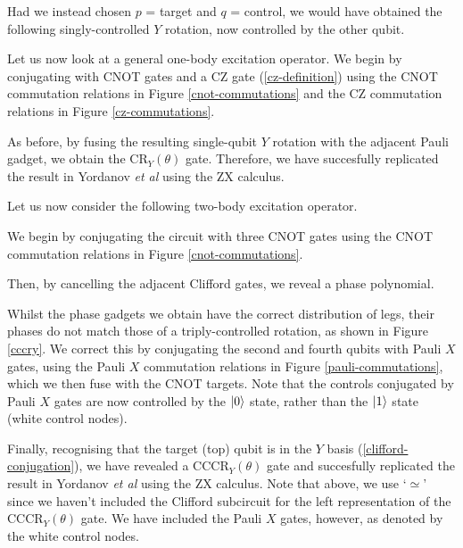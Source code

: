 
Had we instead chosen $p$ = target and $q$ = control, we would have obtained the following singly-controlled $Y$ rotation, now controlled by the other qubit.


Let us now look at a general one-body excitation operator. We begin by conjugating with CNOT gates and a CZ gate (\ref{cz-definition}) using the CNOT commutation relations in Figure \ref{cnot-commutations} and the CZ commutation relations in Figure \ref{cz-commutations}.


As before, by fusing the resulting single-qubit $Y$ rotation with the adjacent Pauli gadget, we obtain the CR$_Y(\theta)$ gate. Therefore, we have succesfully replicated the result in Yordanov \textit{et al} using the ZX calculus.


Let us now consider the following two-body excitation operator.


We begin by conjugating the circuit with three CNOT gates using the CNOT commutation relations in Figure \ref{cnot-commutations}.


Then, by cancelling the adjacent Clifford gates, we reveal a phase polynomial.


Whilst the phase gadgets we obtain have the correct distribution of legs, their phases do not match those of a triply-controlled rotation, as shown in Figure \ref{cccry}. We correct this by conjugating the second and fourth qubits with Pauli $X$ gates, using the Pauli $X$ commutation relations in Figure \ref{pauli-commutations}, which we then fuse with the CNOT targets. Note that the controls conjugated by Pauli $X$ gates are now controlled by the $\ket 0$ state, rather than the $\ket 1$ state (white control nodes).


Finally, recognising that the target (top) qubit is in the $Y$ basis (\ref{clifford-conjugation}), we have revealed a CCCR$_Y(\theta)$ gate and succesfully replicated the result in Yordanov \textit{et al} using the ZX calculus. Note that above, we use `$\simeq$' since we haven't included the Clifford subcircuit for the left representation of the CCCR$_Y(\theta)$ gate. We have included the Pauli $X$ gates, however, as denoted by the white control nodes.

